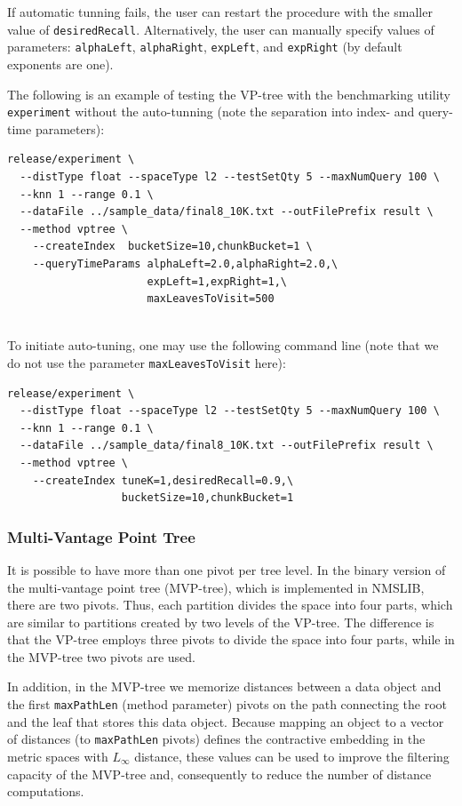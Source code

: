 \documentclass[runningheads,a4paper]{llncs}
\newcommand{\ttt}[1]{\texttt{#1}}
\begin{document}
{If automatic tunning fails,
the user can restart the procedure with the smaller value of \ttt{desiredRecall}.
Alternatively, the user can manually specify values of  parameters:
\ttt{alphaLeft}, \ttt{alphaRight}, \ttt{expLeft}, and \ttt{expRight} (by default exponents are one).

The following is an example of testing the VP-tree with the benchmarking utility \ttt{experiment}
without the auto-tunning (note the separation into index- and query-time parameters):
{
\footnotesize
\begin{verbatim}
release/experiment \
  --distType float --spaceType l2 --testSetQty 5 --maxNumQuery 100 \
  --knn 1 --range 0.1 \
  --dataFile ../sample_data/final8_10K.txt --outFilePrefix result \
  --method vptree \
    --createIndex  bucketSize=10,chunkBucket=1 \
    --queryTimeParams alphaLeft=2.0,alphaRight=2.0,\
                      expLeft=1,expRight=1,\
                      maxLeavesToVisit=500
                 
\end{verbatim}
}

To initiate auto-tuning, one may use the following command line (note that we do 
not use the parameter \texttt{maxLeavesToVisit} here):
{
\footnotesize
\begin{verbatim}
release/experiment \
  --distType float --spaceType l2 --testSetQty 5 --maxNumQuery 100 \
  --knn 1 --range 0.1 \
  --dataFile ../sample_data/final8_10K.txt --outFilePrefix result \
  --method vptree \
    --createIndex tuneK=1,desiredRecall=0.9,\
                  bucketSize=10,chunkBucket=1
\end{verbatim}
}

\subsubsection{Multi-Vantage Point Tree}
It is possible to have more than one pivot per tree level.
In the binary version of the multi-vantage point tree (MVP-tree),
which is implemented in NMSLIB,
there are two pivots.
Thus, each partition divides the space into four parts,
which are similar to partitions created by two levels of the VP-tree.
The difference is that the VP-tree employs three pivots
to divide the space into four parts,
while in the MVP-tree two pivots are used.

In addition, in the MVP-tree we memorize 
distances between a data object and the first \ttt{maxPathLen} (method parameter)
pivots on the path connecting the root and the leaf that stores this data object.
Because mapping an object to a vector of distances (to \ttt{maxPathLen} pivots)
defines the contractive embedding in the metric spaces with $L_{\infty}$ distance,
these values can be used to improve the filtering capacity of the MVP-tree
and, consequently to reduce the number of distance computations.

}
\end{document}
